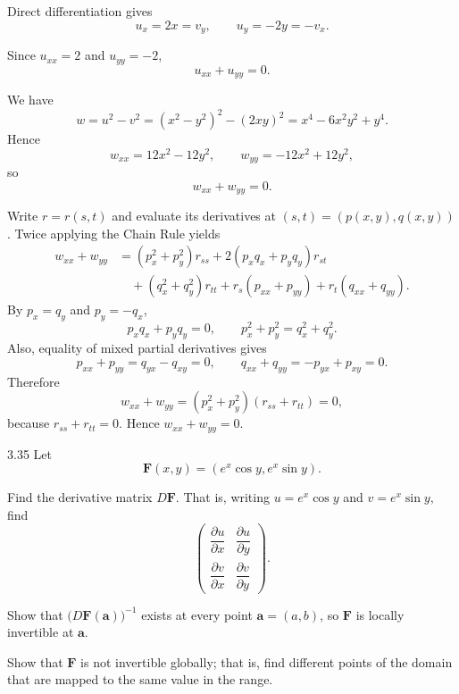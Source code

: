 \documentclass[11pt,oneside]{article}
\begin{document}
\begin{solution}
\begin{problemsubparts}
    \item Direct differentiation gives
    \[
        u_x=2x=v_y,
        \qquad
        u_y=-2y=-v_x.
    \]

    \item Since $u_{xx}=2$ and $u_{yy}=-2$,
    \[
        \boxed{u_{xx}+u_{yy}=0}.
    \]

    \item We have
    \[
        w=u^2-v^2=(x^2-y^2)^2-(2xy)^2=x^4-6x^2y^2+y^4.
    \]
    Hence
    \[
        w_{xx}=12x^2-12y^2,
        \qquad
        w_{yy}=-12x^2+12y^2,
    \]
    so
    \[
        \boxed{w_{xx}+w_{yy}=0}.
    \]

    \item Write $r=r(s,t)$ and evaluate its derivatives at $(s,t)=(p(x,y),q(x,y))$. Twice applying the Chain Rule yields
    \begin{align*}
        w_{xx}+w_{yy}
        &=(p_x^2+p_y^2)r_{ss}+2(p_xq_x+p_yq_y)r_{st}\\
        &\quad+(q_x^2+q_y^2)r_{tt}+r_s(p_{xx}+p_{yy})+r_t(q_{xx}+q_{yy}).
    \end{align*}
    By $p_x=q_y$ and $p_y=-q_x$,
    \[
        p_xq_x+p_yq_y=0,
        \qquad
        p_x^2+p_y^2=q_x^2+q_y^2.
    \]
    Also, equality of mixed partial derivatives gives
    \[
        p_{xx}+p_{yy}=q_{yx}-q_{xy}=0,
        \qquad
        q_{xx}+q_{yy}=-p_{yx}+p_{xy}=0.
    \]
    Therefore
    \[
        w_{xx}+w_{yy}=(p_x^2+p_y^2)(r_{ss}+r_{tt})=0,
    \]
    because $r_{ss}+r_{tt}=0$.
    Hence $\boxed{w_{xx}+w_{yy}=0}$.
\end{problemsubparts}
\end{solution}

\begin{problem}{3.35}
Let
\[
    \mathbf F(x,y)=(e^x\cos y,e^x\sin y).
\]
\begin{problemsubparts}
    \item Find the derivative matrix $D\mathbf F$. That is, writing $u=e^x\cos y$ and $v=e^x\sin y$, find
    \[
        \begin{pmatrix}
            \dfrac{\partial u}{\partial x} & \dfrac{\partial u}{\partial y}\\[0.4em]
            \dfrac{\partial v}{\partial x} & \dfrac{\partial v}{\partial y}
        \end{pmatrix}.
    \]
    \item Show that $\bigl(D\mathbf F(\mathbf a)\bigr)^{-1}$ exists at every point $\mathbf a=(a,b)$, so $\mathbf F$ is locally invertible at $\mathbf a$.
    \item Show that $\mathbf F$ is not invertible globally; that is, find different points of the domain that are mapped to the same value in the range.
\end{problemsubparts}
\end{problem}
\end{document}
